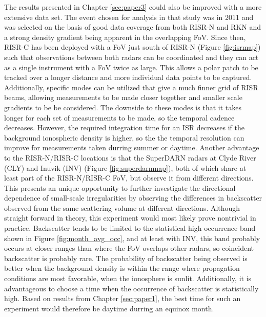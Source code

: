 The results presented in Chapter \ref{sec:paper3} could also be improved with a more extensive data set.  The event chosen for analysis in that study was in 2011 and was selected on the basis of good data coverage from both RISR-N and RKN and a strong density gradient being apparent in the overlapping FoV.  Since then, RISR-C has been deployed with a FoV just south of RISR-N (Figure \ref{fig:isrmap}) such that observations between both radars can be coordinated and they can act as a single instrument with a FoV twice as large.  This allows a polar patch to be tracked over a longer distance and more individual data points to be captured.  Additionally, specific modes can be utilized that give a much finner grid of RISR beams, allowing measurements to be made closer together and smaller scale gradients to be be considered.  The downside to these modes is that it takes longer for each set of measurements to be made, so the temporal cadence decreases.  However, the required integration time for an ISR decreases if the background ionospheric density is higher, so the the temporal resolution can improve for measurements taken durring summer or daytime.  Another advantage to the RISR-N/RISR-C locations is that the SuperDARN radars at Clyde River (CLY) and Inuvik (INV) (Figure \ref{fig:superdarnmap}), both of which share at least part of the RISR-N/RISR-C FoV, but observe it from different directions.  This presents an unique opportunity to further investigate the directional dependence of small-scale irregularities by observing the differences in backscatter observed from the same scattering volume at different directions.  Although straight forward in theory, this experiment would most likely prove nontrivial in practice.  Backscatter tends to be limited to the statistical high occurrence band shown in Figure \ref{fig:month_avg_occ}, and at least with INV, this band probably occurs at closer ranges than where the FoV overlaps other radars, so coincident backscatter is probably rare.  The probability of backscatter being observed is better when the background density is within the range where propagation conditions are most favorable, when the ionosphere is sunlit.  Additionally, it is advantageous to choose a time when the occurrence of backscatter is statistically high.  Based on results from Chapter \ref{sec:paper1}, the best time for such an experiment would therefore be daytime durring an equinox month.

